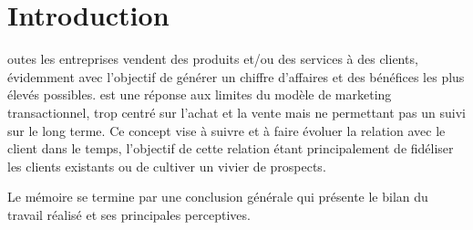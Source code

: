 \chapter{Introduction}

\begin{onehalfspace}
 outes les entreprises vendent des produits et/ou des services à des clients, évidemment avec l’objectif de générer un chiffre d’affaires et des bénéfices les plus élevés possibles.  est une réponse aux limites du modèle de marketing transactionnel, trop centré sur l’achat et la vente mais ne permettant pas un suivi sur le long terme. Ce concept vise à suivre et à faire évoluer la relation avec le client dans le temps, l’objectif de cette relation étant principalement de fidéliser les clients existants ou de cultiver un vivier de prospects.

\noindent Le mémoire se termine par une conclusion générale qui présente le bilan du travail réalisé et ses principales perceptives.
\clearpage

\end{onehalfspace}